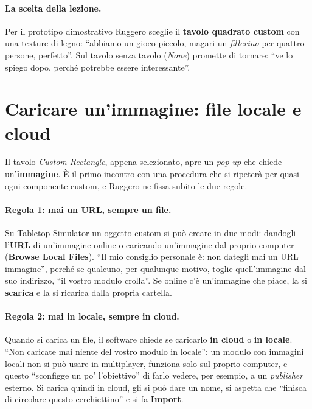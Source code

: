 \paragraph{La scelta della lezione.} Per il prototipo dimostrativo Ruggero sceglie il
\textbf{tavolo quadrato custom} con una texture di legno: ``abbiamo un gioco piccolo,
magari un \emph{fillerino} per quattro persone, perfetto''. Sul tavolo senza tavolo
(\emph{None}) promette di tornare: ``ve lo spiego dopo, perché potrebbe essere
interessante''.

\section{Caricare un'immagine: file locale e cloud}
\label{a8:sec:caricare}

Il tavolo \emph{Custom Rectangle}, appena selezionato, apre un \emph{pop-up} che chiede
un'\textbf{immagine}. È il primo incontro con una procedura che si ripeterà per quasi
ogni componente custom, e Ruggero ne fissa subito le due regole.

\paragraph{Regola 1: mai un URL, sempre un file.} Su Tabletop Simulator un oggetto
custom si può creare in due modi: dandogli l'\textbf{URL} di un'immagine online o
caricando un'immagine dal proprio computer (\textbf{Browse Local Files}). ``Il mio
consiglio personale è: non dategli mai un URL immagine'', perché se qualcuno, per
qualunque motivo, toglie quell'immagine dal suo indirizzo, ``il vostro modulo crolla''.
Se online c'è un'immagine che piace, la si \textbf{scarica} e la si ricarica dalla
propria cartella.

\paragraph{Regola 2: mai in locale, sempre in cloud.} Quando si carica un file, il
software chiede se caricarlo \textbf{in cloud} o \textbf{in locale}. ``Non caricate mai
niente del vostro modulo in locale'': un modulo con immagini locali non si può usare
in multiplayer, funziona solo sul proprio computer, e questo ``sconfigge un po'
l'obiettivo'' di farlo vedere, per esempio, a un \emph{publisher} esterno. Si carica
quindi in cloud, gli si può dare un nome, si aspetta che ``finisca di circolare questo
cerchiettino'' e si fa \textbf{Import}.

